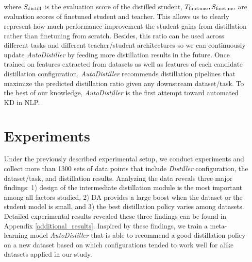 \documentclass[11pt]{article}
\begin{document}
where $S_\textsuperscript{distill}$ is the evaluation score of the distilled student, $T_\textsuperscript{finetune}, S_\textsuperscript{finetune}$ are evaluation scores of finetuned student and teacher. This allows us to clearly represent how much performance improvement the student gains from distillation rather than finetuning from scratch. Besides, this ratio can be used across different tasks and different teacher/student architectures so we can continuously update \emph{AutoDistiller} by feeding more distillation results in the future. Once trained on features extracted from datasets as well as features of each candidate distillation configuration, \emph{AutoDistiller} recommends distillation pipelines that maximize the predicted distillation ratio given any downstream dataset/task. To the best of our knowledge, \emph{AutoDistiller} is the first attempt toward automated KD in NLP.
\label{sec:autodistiller}
\section{Experiments}
\label{sec:experiments}

Under the previously described experimental setup, we conduct experiments and collect more than 1300 sets of data points that include \emph{Distiller} configuration, the dataset/task, and distillation results. Analyzing the data reveals three major findings: 1) design of the intermediate distillation module is the most important among all factors studied, 2) DA provides a large boost when the dataset or the student model is small, and 3) the best distillation policy varies among datasets. Detailed experimental results revealed these three findings can be found in Appendix \ref{additional_results}. Inspired by these findings, we train a meta-learning model \emph{AutoDistiller} that is able to recommend a good distillation policy on a new dataset based on which configurations tended to work well for alike datasets applied in our study.
\end{document}
